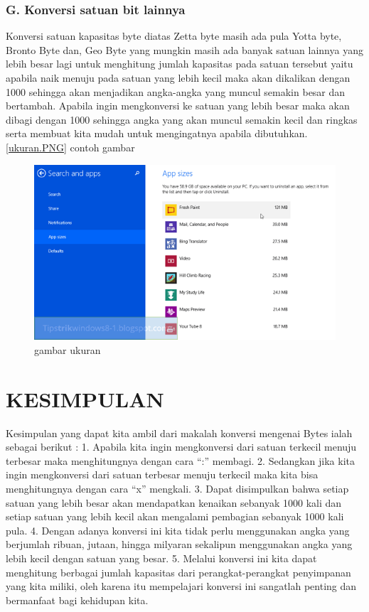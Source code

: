 \subsubsection {G. Konversi satuan bit lainnya}
Konversi satuan kapasitas byte diatas Zetta byte masih ada pula Yotta byte, Bronto Byte dan, Geo Byte yang mungkin masih ada banyak satuan lainnya yang lebih besar lagi untuk menghitung jumlah kapasitas pada satuan tersebut yaitu apabila naik menuju pada satuan yang lebih kecil maka akan dikalikan dengan 1000 sehingga akan menjadikan angka-angka yang muncul semakin besar dan bertambah. 
Apabila ingin mengkonversi ke satuan yang lebih besar maka akan dibagi dengan 1000 sehingga angka yang akan muncul semakin kecil dan ringkas serta membuat kita mudah untuk mengingatnya apabila dibutuhkan.
\ref{ukuran.PNG}
contoh gambar

\begin{figure}[ht]
\centerline{\includegraphics[width=1\textwidth]{figures/ukuran.png}}
\caption{gambar ukuran}
\label{ukuran}
\end{figure}

\section {KESIMPULAN}
Kesimpulan yang dapat kita ambil dari makalah konversi mengenai Bytes ialah sebagai berikut :
1.	Apabila kita ingin mengkonversi dari satuan terkecil menuju terbesar maka menghitungnya dengan cara “:” membagi.
2.	Sedangkan jika kita ingin mengkonversi dari satuan terbesar menuju terkecil maka kita bisa menghitungnya dengan cara “x” mengkali.
3.	Dapat disimpulkan bahwa setiap satuan yang lebih besar akan mendapatkan kenaikan sebanyak 1000 kali dan setiap satuan yang lebih kecil akan mengalami pembagian sebanyak 1000 kali pula.
4.	Dengan adanya konversi ini kita tidak perlu menggunakan angka yang berjumlah ribuan, jutaan, hingga milyaran sekalipun menggunakan angka yang lebih kecil dengan satuan yang besar.
5.	Melalui konversi ini kita dapat menghitung berbagai jumlah kapasitas dari perangkat-perangkat penyimpanan yang kita miliki, oleh karena itu mempelajari konversi ini sangatlah penting dan bermanfaat bagi kehidupan kita. \cite{jungwirth2002information}